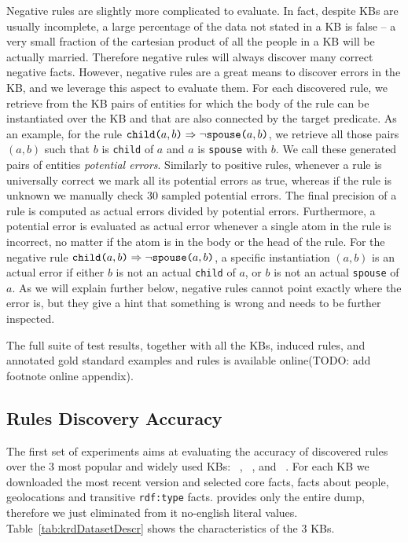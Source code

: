 Negative rules are slightly more complicated to evaluate. In fact, despite KBs are usually incomplete, a large percentage of the data not stated in a KB is false -- a very small fraction of the cartesian product of all the people in a KB will be actually married. Therefore negative rules will always discover many correct negative facts. However, negative rules are a great means to discover errors in the KB, and we leverage this aspect to evaluate them. For each discovered rule, we retrieve from the KB pairs of entities for which the body of the rule can be instantiated over the KB and that are also connected by the target predicate. As an example, for the rule $\texttt{child(}a,b\texttt{)} \Rightarrow \neg \texttt{spouse(}a,b\texttt{)}$, we retrieve all those pairs $(a,b)$ such that $b$ is \texttt{child} of $a$ and $a$ is \texttt{spouse} with $b$. We call these generated pairs of entities \emph{potential errors}. Similarly to positive rules, whenever a rule is universally correct we mark all its potential errors as true, whereas if the rule is unknown we manually check 30 sampled potential errors. The final precision of a rule is computed as actual errors divided by potential errors. Furthermore, a potential error is evaluated as actual error whenever a single atom in the rule is incorrect, no matter if the atom is in the body or the head of the rule. For the negative rule $\texttt{child(}a,b\texttt{)} \Rightarrow \neg \texttt{spouse(}a,b\texttt{)}$, a specific instantiation $(a,b)$ is an actual error if either $b$ is not an actual \texttt{child} of $a$, or $b$ is not an actual \texttt{spouse} of $a$. As we will explain further below, negative rules cannot point exactly where the error is, but they give a hint that something is wrong and needs to be further inspected.

The full suite of test results, together with all the KBs, induced rules, and annotated gold standard examples and rules is available online(TODO: add footnote online appendix).

\subsection{Rules Discovery Accuracy} \label{sec:gen_evaluation}
The first set of experiments aims at evaluating the accuracy of discovered rules over the 3 most popular and widely used KBs: \dbpedia~\cite{bizer2009dbpedia}, \yago~\cite{suchanek2007yago}, and \wikidata~\cite{vrandevcic2014wikidata}. For each KB we downloaded the most recent version and selected core facts, facts about people, geolocations and transitive \texttt{rdf:type} facts. \wikidata provides only the entire dump, therefore we just eliminated from it no-english literal values. Table~\ref{tab:krdDatasetDescr} shows the characteristics of the 3 KBs.

